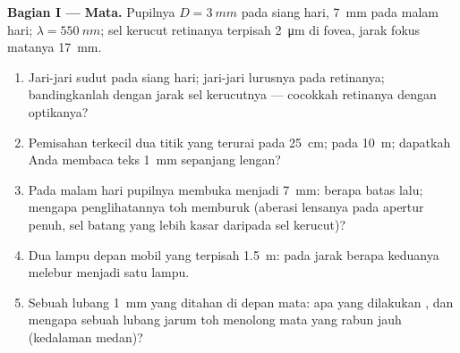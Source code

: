 \begin{problem}
\label{pb:b2:diffraction:1}

\medskip
\noindent\textbf{Bagian I --- Mata.}
Pupilnya $D = \qty{3}{mm}$ pada siang hari, \qty{7}{mm} pada malam hari; $\lambda = \qty{550}{nm}$;
sel kerucut retinanya terpisah \qty{2}{\micro m} di fovea, jarak fokus
matanya \qty{17}{mm}.
\begin{enumerate}
  \item Jari-jari sudut  pada siang hari; jari-jari lurusnya pada
        retinanya; bandingkanlah dengan jarak sel kerucutnya --- cocokkah retinanya
        dengan optikanya?
  \item Pemisahan terkecil dua titik yang terurai pada \qty{25}{cm}; pada
        \qty{10}{m}; dapatkah Anda membaca teks \qty{1}{mm} sepanjang lengan?
  \item Pada malam hari pupilnya membuka menjadi \qty{7}{mm}: berapa batas  lalu;
        mengapa penglihatannya toh memburuk (aberasi
        lensanya pada apertur penuh, sel batang yang lebih kasar daripada sel kerucut)?
  \item Dua lampu depan mobil yang terpisah \qty{1.5}{m}: pada jarak berapa keduanya melebur
        menjadi satu lampu.
  \item Sebuah lubang \qty{1}{mm} yang ditahan di depan mata: apa yang dilakukan ,
        dan mengapa sebuah lubang jarum toh menolong mata yang rabun jauh
        (kedalaman medan)?
\end{enumerate}


\end{problem}
